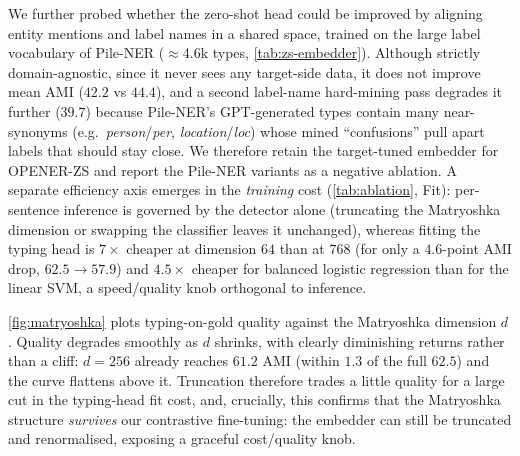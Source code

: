 We further probed whether the zero-shot head could be improved by aligning entity mentions and label names in a shared space, trained on the large label vocabulary of Pile-NER \cite{zhou2024universalner} ($\approx$4.6k types, \autoref{tab:zs-embedder}).
Although strictly domain-agnostic, since it never sees any target-side data, it does not improve mean AMI ($42.2$ vs $44.4$), and a second label-name hard-mining pass degrades it further ($39.7$) because Pile-NER's GPT-generated types contain many near-synonyms (e.g.\ \emph{person}/\emph{per}, \emph{location}/\emph{loc}) whose mined ``confusions'' pull apart labels that should stay close.
We therefore retain the target-tuned embedder for OPENER-ZS and report the Pile-NER variants as a negative ablation.
A separate efficiency axis emerges in the \emph{training} cost (\autoref{tab:ablation}, Fit): per-sentence inference is governed by the detector alone (truncating the Matryoshka dimension or swapping the classifier leaves it unchanged), whereas fitting the typing head is $7\times$ cheaper at dimension $64$ than at $768$ (for only a $4.6$-point AMI drop, $62.5\!\to\!57.9$) and $4.5\times$ cheaper for balanced logistic regression than for the linear SVM, a speed/quality knob orthogonal to inference.

\autoref{fig:matryoshka} plots typing-on-gold quality against the Matryoshka dimension $d$. Quality degrades smoothly as $d$ shrinks, with clearly diminishing returns rather than a cliff: $d{=}256$ already reaches $61.2$ AMI (within $1.3$ of the full $62.5$) and the curve flattens above it. Truncation therefore trades a little quality for a large cut in the typing-head fit cost, and, crucially, this confirms that the Matryoshka structure \emph{survives} our contrastive fine-tuning: the embedder can still be truncated and renormalised, exposing a graceful cost/quality knob.


